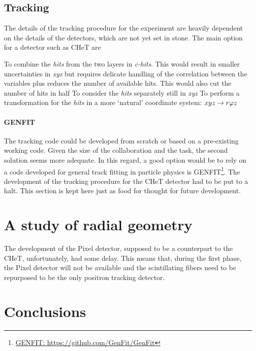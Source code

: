 \begin{refsection}
    \subsection{Tracking}
    The details of the tracking procedure for the experiment are heavily dependent on the details of the detectors, which are not yet set in stone.
    The main option for a detector such as CHeT are
    \begin{outline}
        \1 To combine the \textit{hits} from the two layers in \textit{c-hits}. This would result in smaller uncertainties in \textit{xyz} but requires delicate handling of the correlation between the variables plus reduces the number of available hits. This would also cut the number of hits in half
        \1 To consider the \textit{hits} separately still in \textit{xyz}
        \1 To perform a transformation for the \textit{hits} in a more `natural' coordinate system: $xyz\rightarrow r\varphi z$
    \end{outline}

    \paragraph{GENFIT}
        The tracking code could be developed from scratch or based on a pre-existing working code. 
        Given the size of the collaboration and the task, the second solution seems more adequate.
        In this regard, a good option would be to rely on a code developed for general track fitting in particle physics is GENFIT\footnote{\href{https://github.com/GenFit/GenFit}{GENFIT: https://github.com/GenFit/GenFit}}.
        The development of the tracking procedure for the CHeT detector had to be put to a halt. This section is kept here just as food for thought for future development.

\section{A study of radial geometry}
    The development of the Pixel detector, supposed to be a counterpart to the CHeT, unfortunately, had some delay.
    This means that, during the first phase, the Pixel detector will not be available and the scintillating fibers need to be repurposed to be the only positron tracking detector.
    
\section{Conclusions}

\printbibliography[
    heading = bibliographychapter,
    title=Bibliography on muEDM positron tracker
]

\end{refsection}